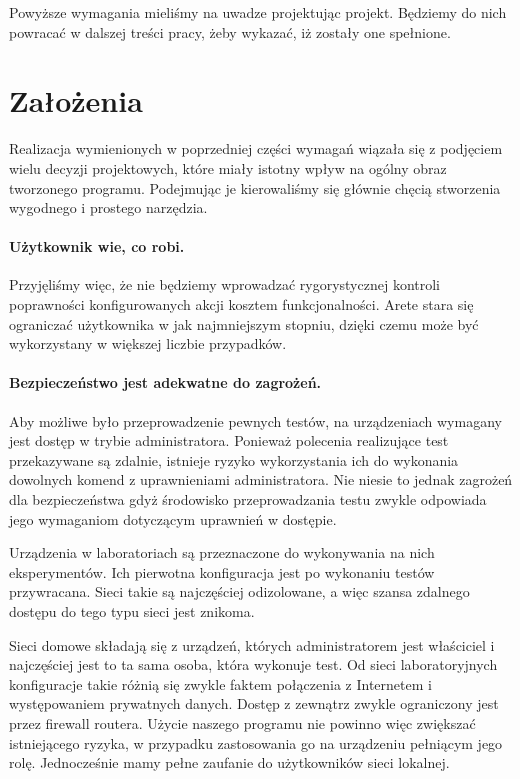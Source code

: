 \documentclass[00-praca-magisterska.tex]{subfiles}
\begin{document}
Powyższe wymagania mieliśmy na uwadze projektując projekt. Będziemy do nich
powracać w dalszej treści pracy, żeby wykazać, iż zostały one spełnione.

\section{Założenia}
\label{arete-zalozenia}

Realizacja wymienionych w poprzedniej części wymagań wiązała się z podjęciem
wielu decyzji projektowych, które miały istotny wpływ na ogólny obraz tworzonego
programu.  Podejmując je kierowaliśmy się głównie chęcią stworzenia wygodnego i
prostego narzędzia.

\paragraph{Użytkownik wie, co robi.} Przyjęliśmy więc, że nie będziemy
wprowadzać rygorystycznej kontroli poprawności konfigurowanych akcji kosztem
funkcjonalności. Arete stara się ograniczać użytkownika w jak najmniejszym stopniu,
dzięki czemu może być wykorzystany w większej liczbie przypadków.

\paragraph{Bezpieczeństwo jest adekwatne do zagrożeń.} Aby możliwe było
przeprowadzenie pewnych testów, na urządzeniach wymagany jest dostęp w trybie
administratora. Ponieważ polecenia realizujące test przekazywane są zdalnie,
istnieje ryzyko wykorzystania ich do wykonania dowolnych komend z uprawnieniami
administratora. Nie niesie to jednak zagrożeń dla bezpieczeństwa gdyż środowisko
przeprowadzania testu zwykle odpowiada jego wymaganiom dotyczącym uprawnień w
dostępie.

Urządzenia w laboratoriach są przeznaczone do wykonywania na nich
eksperymentów.  Ich pierwotna konfiguracja jest po wykonaniu testów
przywracana. Sieci takie są najczęściej odizolowane, a więc szansa zdalnego
dostępu do tego typu sieci jest znikoma.

Sieci domowe składają się z urządzeń, których administratorem jest właściciel i
najczęściej jest to ta sama osoba, która wykonuje test. Od sieci laboratoryjnych
konfiguracje takie różnią się zwykle faktem połączenia z Internetem i
występowaniem prywatnych danych. Dostęp z zewnątrz zwykle ograniczony jest przez
firewall routera. Użycie naszego programu nie powinno więc zwiększać
istniejącego ryzyka, w przypadku zastosowania go na urządzeniu pełniącym jego
rolę. Jednocześnie mamy pełne zaufanie do użytkowników sieci lokalnej.
\end{document}
